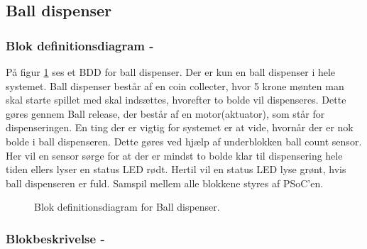 \documentclass[Arkitektur/System_main.tex]{subfiles}
\begin{document}
\subsection{Ball dispenser} \label{sec:balldispenser_hardware}
\subsubsection{Blok definitionsdiagram - } \label{sec:balldispenser_hardware_bdd}

På figur \ref{fig:balldispenser_hardware_bdd} ses et BDD for ball dispenser. Der er kun en ball dispenser i hele systemet. Ball dispenser består af en coin collecter, hvor 5 krone mønten man skal starte spillet med skal indsættes, hvorefter to bolde vil dispenseres. Dette gøres gennem Ball release, der består af en motor(aktuator), som står for dispenseringen. En ting der er vigtig for systemet er at vide, hvornår der er nok bolde i ball dispenseren. Dette gøres ved hjælp af underblokken ball count sensor. Her vil en sensor sørge for at der er mindst to bolde klar til dispensering hele tiden ellers lyser en status LED rødt. Hertil vil en status LED lyse grønt, hvis ball dispenseren er fuld. Samspil mellem alle blokkene styres af PSoC'en.

\begin{figure}[H]
    \centering
    \caption{Blok definitionsdiagram for Ball dispenser.}
    \label{fig:balldispenser_hardware_bdd}
\end{figure}

\subsubsection{Blokbeskrivelse - } \label{sec:balldispenser_hardware_block_description}
\end{document}
